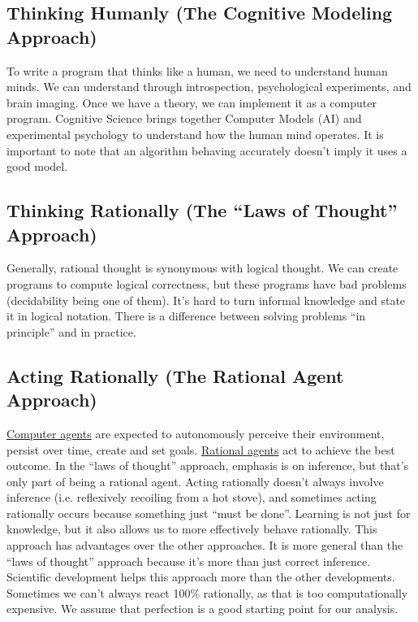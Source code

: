 
\subsection{Thinking Humanly (The Cognitive Modeling Approach)} %
\label{subsec:thinking_humanly}

To write a program that thinks like a human, we need to understand human minds.
We can understand through introspection, psychological experiments, and brain
imaging.
Once we have a theory, we can implement it as a computer program.
Cognitive Science brings together Computer Models (AI) and experimental
psychology to understand how the human mind operates.
It is important to note that an algorithm behaving accurately doesn't imply it
uses a good model.


\subsection{Thinking Rationally (The ``Laws of Thought'' Approach)} %
\label{subsec:thinking_rationally}

Generally, rational thought is synonymous with logical thought.
We can create programs to compute logical correctness, but these programs have
bad problems (decidability being one of them).
It's hard to turn informal knowledge and state it in logical notation.
There is a difference between solving problems ``in principle'' and in practice.


\subsection{Acting Rationally (The Rational Agent Approach)} %
\label{subsec:acting_rationally}

\uline{Computer agents} are expected to autonomously perceive their environment,
persist over time, create and set goals.
\uline{Rational agents} act to achieve the best outcome.
In the ``laws of thought'' approach, emphasis is on inference, but that's only
part of being a rational agent.
Acting rationally doesn't always involve inference (i.e. reflexively recoiling
from a hot stove), and sometimes acting rationally occurs because something just
``must be done''. %
Learning is not just for knowledge, but it also allows us to more effectively
behave rationally.
This approach has advantages over the other approaches.
It is more general than the ``laws of thought'' approach because it's more than
just correct inference.
Scientific development helps this approach more than the other developments.
Sometimes we can't always react 100\% rationally, as that is too computationally
expensive.
We assume that perfection is a good starting point for our analysis.


